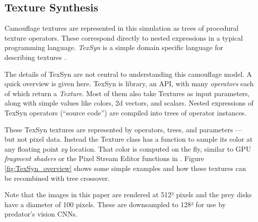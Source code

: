 \documentclass[letterpaper]{article}
\newcommand{\jargon}[1]{\textit{#1}}
\newcommand{\texsyn}[0]{TexSyn}
\begin{document}
\subsection{Texture Synthesis}
\label{subsec:texture_synthesis}
Camouflage textures are represented in this simulation as trees of procedural texture operators. These correspond directly to nested expressions in a typical programming language. \jargon{\texsyn{}} is a simple domain specific language for describing textures \citep{reynolds_texsyn_2019}.
\par
The details of \texsyn{} are not central to understanding this camouflage model. A quick overview is given here. \texsyn{} is library, an API, with many \jargon{operators} each of which return a \jargon{Texture}. Most of them also take Textures as input parameters, along with simple values like colors, 2d vectors, and scalars. Nested expressions of \texsyn{} operators (“source code”) are compiled into trees of operator instances.
\par
These \texsyn{} textures are represented by operators, trees, and parameters — but not pixel data. Instead the Texture class has a function to sample its color at any floating point \textit{xy} location. That color is computed on the fly, similar to GPU \jargon{fragment shaders} or the Pixel Stream Editor functions in \citet{perlin_image_1985}. Figure \ref{fig:TexSyn_overview} shows some simple examples and how these textures can be recombined with tree crossover.
\par
Note that the images in this paper are rendered at 512² pixels and the prey disks have a diameter of 100 pixels. These are downsampled to 128² for use by predator's vision CNNs.
\par

\end{document}
